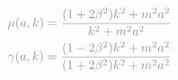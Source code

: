 \documentclass[preview]{standalone}
\begin{document}
\begin{gather}
\notag
\textcolor{Gray}{\mu(a,k)=\frac{(1+2 \beta^2 )k^2 + m^2 a^2}{k^2 + m^2 a^2}} \\ 
\notag
\textcolor{Gray}{\gamma(a,k)=\frac{(1-2 \beta^2 )k^2 + m^2 a^2}{(1+2 \beta^2 )k^2 + m^2 a^2}} 
\end{gather}
\end{document}
